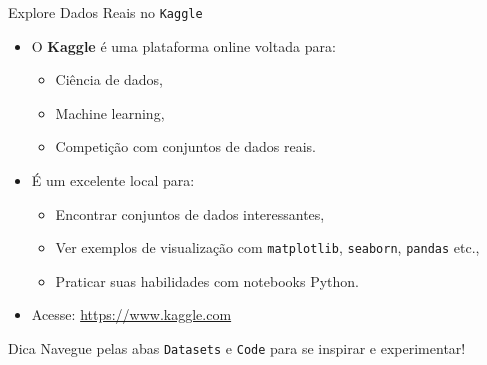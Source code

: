 \begin{frame}{Explore Dados Reais no \texttt{Kaggle}}
    \begin{itemize}
        \item O \textbf{Kaggle} é uma plataforma online voltada para:
        \begin{itemize}
            \item Ciência de dados,
            \item Machine learning,
            \item Competição com conjuntos de dados reais.
        \end{itemize}

        \item É um excelente local para:
        \begin{itemize}
            \item Encontrar conjuntos de dados interessantes,
            \item Ver exemplos de visualização com \texttt{matplotlib}, \texttt{seaborn}, \texttt{pandas} etc.,
            \item Praticar suas habilidades com notebooks Python.
        \end{itemize}

        \item Acesse: \url{https://www.kaggle.com}
    \end{itemize}

    \vspace{1em}
    \begin{alertblock}{Dica}
        Navegue pelas abas \texttt{Datasets} e \texttt{Code} para se inspirar e experimentar!
    \end{alertblock}
\end{frame}


